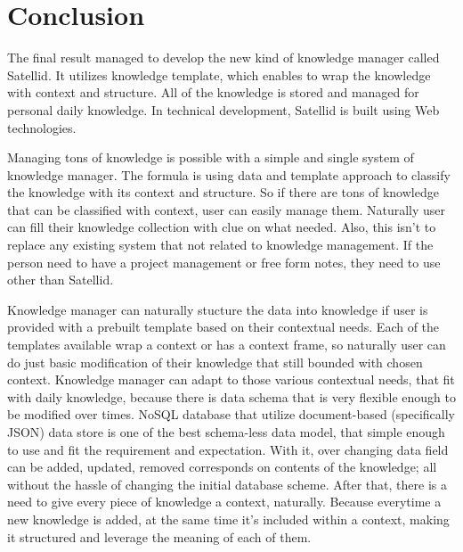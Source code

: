 \section{Conclusion}
\label{sec:conclusion}

The final result managed to develop the new kind of knowledge manager called Satellid.
It utilizes knowledge template, which enables to wrap the knowledge with context and structure.
All of the knowledge is stored and managed for personal daily knowledge.
In technical development, Satellid is built using Web technologies.

Managing tons of knowledge is possible with a simple and single system of knowledge manager.
The formula is using data and template approach to classify the knowledge with its context and structure.
So if there are tons of knowledge that can be classified with context, user can easily manage them.
Naturally user can fill their knowledge collection with clue on what needed.
Also, this isn't to replace any existing system that not related to knowledge management.
If the person need to have a project management or free form notes, they need to use other than Satellid.


Knowledge manager can naturally stucture the data into knowledge if user is provided with a prebuilt template based on their contextual needs.
Each of the templates available wrap a context or has a context frame, so naturally user can do just basic modification of their knowledge that still bounded with chosen context.
%
Knowledge manager can adapt to those various contextual needs, that fit with daily knowledge, because there is data schema that is very flexible enough to be modified over times.
\ac{NoSQL} database that utilize document-based (specifically \ac{JSON}) data store is one of the best schema-less data model, that simple enough to use and fit the requirement and expectation.
With it, over changing data field can be added, updated, removed corresponds on contents of the knowledge; all without the hassle of changing the initial database scheme.
After that, there is a need to give every piece of knowledge a context, naturally.
Because everytime a new knowledge is added, at the same time it's included within a context, making it structured and leverage the meaning of each of them.

